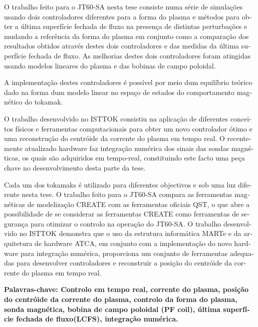 \begin{otherlanguage}{portuguese}
O trabalho feito para o JT60-SA nesta tese consiste numa série de simulações usando dois controladores diferentes para a forma do plasma e métodos para obter a última superfície fechada de fluxo na presença de distintas perturbações e mudando a referência da forma do plasma  em conjunto como a comparação dos resultados obtidos através destes dois controladores e  das medidas  da última superfície fechada de fluxo.  As melhorias destes dois controladores foram atingidas usando modelos lineares  do plasma e das bobinas de campo poloidal.\smallskip

A implementação destes controladores é  possível por meio dum equilíbrio teórico dado na forma dum modelo linear no espaço de estados do comportamento magnético do tokamak. \smallskip


O trabalho desenvolvido no ISTTOK consistiu na aplicação de diferentes conceitos físicos e ferramentas computacionais para obter um novo controlador ótimo e uma reconstrução do centróide da corrente do plasma em tempo real. O recentemente atualizado hardware faz integração numérica dos sinais das sondas magnéticas, os quais são adquiridos em tempo-real, constituindo este facto uma peça chave no desenvolvimento desta parte da tese. \smallskip


Cada um dos tokamaks é utilizado para diferentes objectivos e sob uma luz diferente nesta tese. O trabalho feito para o JT60-SA compara as ferramentas magnéticas de modelização CREATE com as ferramentas oficiais QST, o que abre a possibilidade de se considerar as ferramentas CREATE como ferramentas de segurança para otimizar o controlo na operação do JT60-SA. O trabalho desenvolvido no ISTTOK demonstra que o uso da estrutura informática MARTe e da arquitetura de hardware ATCA, em conjunto com a implementação do novo hardware para integração numérica, proporciona um conjunto de ferramentas adequadas para desenvolver controladores e reconstruir a posição do centróide da corrente do plasma em tempo real. \smallskip


\vfill
\textbf{ Palavras-chave: Controlo em tempo real, corrente do plasma, posição do centróide da corrente do plasma,   controlo da forma do plasma, sonda magnética, bobina de campo poloidal (PF coil), última superfície fechada de fluxo(LCFS), integração numérica.    } 

\end{otherlanguage}
\pagebreak
